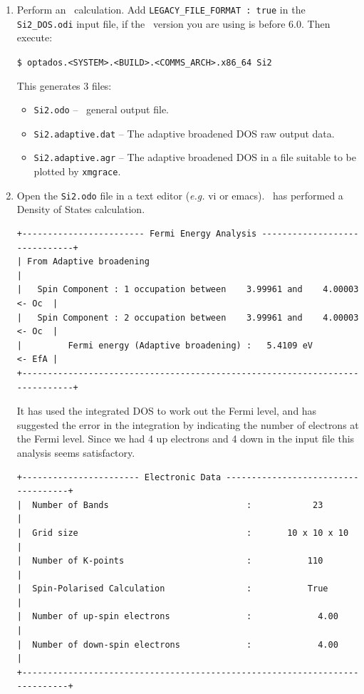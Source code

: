 \documentclass[a4paper,11pt,twoside]{book}
\begin{document}
{\begin{enumerate}
  \verb#$ castep Si2# 

This should take a couple of seconds to run. More help can be found in  the tutorials  on  the \castep\ website \verb#www.castep.org#.  

\item Perform an \optados\ calculation.  Add \verb#LEGACY_FILE_FORMAT : true# in the \verb#Si2_DOS.odi# input file, if the \castep\ version you are using is before 6.0. Then execute:   
 
\verb#$ optados.<SYSTEM>.<BUILD>.<COMMS_ARCH>.x86_64 Si2# 

This generates 3 files:
\begin{itemize}
\item \verb#Si2.odo# -- \optados\ general output file.
\item \verb#Si2.adaptive.dat# -- The adaptive broadened DOS raw output data.
\item  \verb#Si2.adaptive.agr# -- The adaptive broadened DOS in a file suitable to be plotted by  \verb#xmgrace#.   
\end{itemize}

\item Open the \verb#Si2.odo# file in a text editor (\emph{e.g.} vi or emacs).  \optados\ has performed a Density of States calculation.

\begin{verbatim}
+------------------------ Fermi Energy Analysis ------------------------------+
| From Adaptive broadening                                                    |
|   Spin Component : 1 occupation between    3.99961 and    4.00003    <- Oc  |
|   Spin Component : 2 occupation between    3.99961 and    4.00003    <- Oc  | 
|         Fermi energy (Adaptive broadening) :   5.4109 eV             <- EfA |
+-----------------------------------------------------------------------------+
\end{verbatim}
It has used the integrated DOS to work out the Fermi level, and has suggested the error in the integration by indicating the number of electrons at the Fermi level. Since we had 4 up electrons and 4 down in the input file this analysis seems satisfactory.
\begin{verbatim}
+----------------------- Electronic Data ------------------------------------+
|  Number of Bands                           :            23                 |
|  Grid size                                 :       10 x 10 x 10            |
|  Number of K-points                        :           110                 |
|  Spin-Polarised Calculation                :           True                |
|  Number of up-spin electrons               :             4.00              |
|  Number of down-spin electrons             :             4.00              |
+----------------------------------------------------------------------------+
\end{verbatim}


\end{enumerate}}
\end{document}
